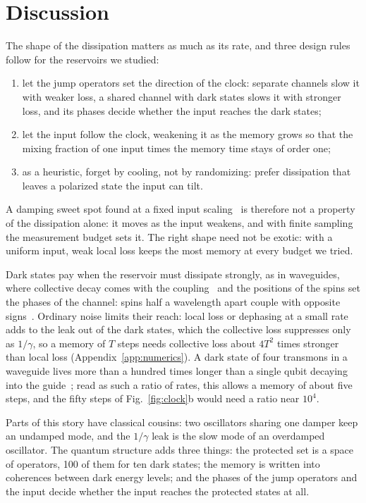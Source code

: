 \section{Discussion}
\label{sec:discussion}
The shape of the dissipation matters as much as its rate, and three design rules follow for the reservoirs we
studied:
\begin{enumerate}[label=(\arabic*),leftmargin=*,itemsep=2pt,topsep=4pt]
\item let the jump operators set the direction of the clock: separate channels slow it with weaker loss, a shared
  channel with dark states slows it with stronger loss, and its phases decide whether the input reaches the dark
  states;
\item let the input follow the clock, weakening it as the memory grows so that the mixing fraction of one input times
  the memory time stays of order one;
\item as a heuristic, forget by cooling, not by randomizing: prefer dissipation that leaves a polarized state the
  input can tilt.
\end{enumerate}
A damping sweet spot found at a fixed input scaling~\cite{Sannia2024} is therefore not a property of the dissipation
alone: it moves as the input weakens, and with finite sampling the measurement budget sets it. The right shape need
not be exotic: with a uniform input, weak local loss keeps the most memory at every budget we tried.

Dark states pay when the reservoir must dissipate strongly, as in waveguides, where collective decay comes with the
coupling~\cite{Zanner2022,Sheremet2023} and the positions of the spins set the phases of the channel: spins half a
wavelength apart couple with opposite signs~\cite{Sheremet2023}. Ordinary noise limits their reach: local loss or
dephasing at a small rate adds to the leak out of the dark states, which the collective loss suppresses only as
$1/\gamma$, so a memory of $T$ steps needs collective loss about $4T^2$ times stronger than local loss
(Appendix~\ref{app:numerics}). A dark state of four transmons in a waveguide lives more than a hundred times longer
than a single qubit decaying into the guide~\cite{Zanner2022}; read as such a ratio of rates, this allows a memory of
about five steps, and the fifty steps of Fig.~\ref{fig:clock}b would need a ratio near $10^4$.

Parts of this story have classical cousins: two oscillators sharing one damper keep an undamped mode, and the
$1/\gamma$ leak is the slow mode of an overdamped oscillator. The quantum structure adds three things: the protected
set is a space of operators, 100 of them for ten dark states; the memory is written into coherences between dark
energy levels; and the phases of the jump operators and the input decide whether the input reaches the protected
states at all.

